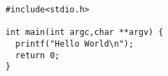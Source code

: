 \documentclass{article}
\begin{document}
\begin{verbatim}
#include<stdio.h>

int main(int argc,char **argv) {
  printf("Hello World\n");
  return 0;
}
\end{verbatim}
\end{document}
